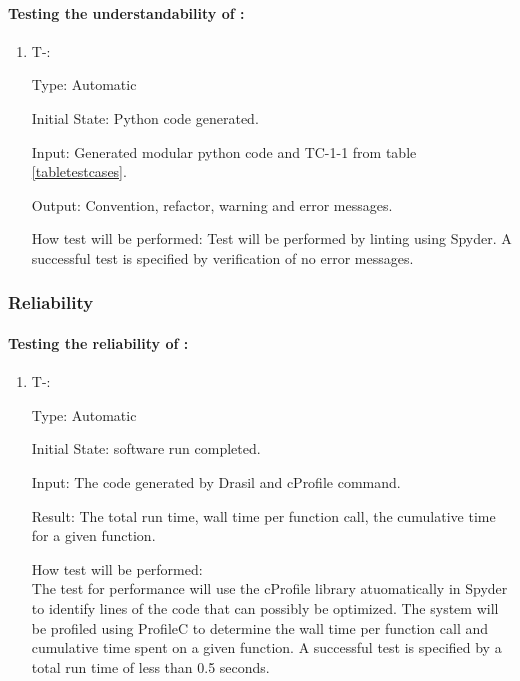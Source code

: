\documentclass[12pt, titlepage]{article}
\newcounter{tinnum} %
\begin{document}
\paragraph{Testing the understandability of \progname{}:}
\begin{enumerate}

\item{T-}\thetinnum\label{T-11}:

Type: Automatic
					
Initial State: Python code generated.
					
Input: Generated modular python code and TC-1-1 from table \ref{tabletestcases}.
					
Output: Convention, refactor, warning and error messages.
					
How test will be performed: Test will be performed by linting using Spyder. A successful test is specified by verification of no error messages.
				

\end{enumerate}

\subsubsection{Reliability} \label{nonfunc_reliability}
\paragraph{Testing the reliability of \progname{}:}

\begin{enumerate}

\item{T-}\thetinnum\label{T-12}:

Type: Automatic
					
Initial State: \progname{} software run completed.
					
Input: The code generated by Drasil and cProfile command.

Result: The total run time, wall time per function call, the cumulative time for a given function.
			
					
How test will be performed: \\
The test for performance will use the cProfile library 
atuomatically in Spyder to identify lines of the code that can possibly be 
optimized. The system will be profiled using ProfileC to determine the wall time 
per function call and cumulative time spent on a given function. A successful test is specified by a total run time of less than 0.5 seconds. \\
\end{enumerate}
\end{document}
